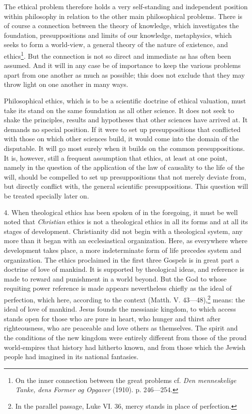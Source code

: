 \documentclass[12pt,a4paper,openany]{book}
\newcommand{\opage}[1]{\marginnote{\footnotesize\textit{[#1]}}}
\begin{document}
The ethical problem therefore holds a very self-standing and independent position within philosophy
in relation to the other main philosophical problems. There is of course a connection between the theory
of knowledge, which investigates the foundation, presuppositions and limits of our knowledge,
metaphysics, which seeks to form a world-view, a general theory of the nature of existence,
\opage{20}and ethics\footnote[1]{On the inner connection between the great problems cf. \textit{Den
menneskelige Tanke, dens Former og Opgaver} (1910). p. 246---254.}. But the connection is not so
direct and immediate as has often been assumed. And it will in any case be of importance to keep the
various problems apart from one another as much as possible; this does not exclude that they may
throw light on one another in many ways.

Philosophical ethics, which is to be a scientific doctrine of ethical valuation, must take its stand
on the same foundation as all other science. It does not seek to shake the principles, results and
hypotheses that other sciences have arrived at. It demands no special position. If it were to set up
presuppositions that conflicted with those on which other sciences build, it would come into the
domain of the disputable. It will go most surely when it builds on the common presuppositions. It is,
however, still a frequent assumption that ethics, at least at one point, namely in the question of
the application of the law of causality to the life of the will, should be compelled to set up
presuppositions that not merely deviate from, but directly conflict with, the general scientific
presuppositions. This question will be treated specially later on.

4. When theological ethics has been spoken of in the foregoing, it must be well noted that
\textit{Christian} ethics is not a theological ethics in all its forms and at all its stages of
development. Christianity did not begin with a theological system, any more than it began with an
ecclesiastical organization. Here, as everywhere where development takes place, a more indeterminate
form of life precedes system and organization. The ethics proclaimed in the first three Gospels is
in great part a doctrine of love of mankind. It is supported by theological ideas, and reference is
made to reward and punishment in a world beyond. But the God to whose requiting power reference is
made appears nevertheless chiefly as the ideal of perfection, which here, according to the context
(Matth. V. 43---48),\footnote[2]{In the parallel passage, Luke VI. 36, mercy stands in place of
perfection.} means:
\opage{21}the ideal of love of mankind. Jesus founds the messianic kingdom, to which access stands open for
those who are pure in heart, who hunger and thirst after righteousness, who are peaceable and love
others as themselves. The spirit and the conditions of the new kingdom were entirely different from
those of the proud world-empires that history had hitherto known, and from those which the Jewish
people had imagined in its national fantasies.
\end{document}
